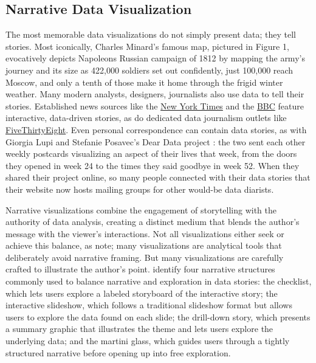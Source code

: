 \subsection{Narrative Data Visualization}\label{lit-review-narrative}
The most memorable data visualizations do not simply present data; they tell stories. Most iconically, Charles Minard's famous map, pictured in Figure 1, evocatively depicts Napoleons Russian campaign of 1812 by mapping the army's journey and its size as 422,000 soldiers set out confidently, just 100,000 reach Moscow, and only a tenth of those make it home through the frigid winter weather. Many modern analysts, designers, journalists also use data to tell their stories. Established news sources like the \href{http://www.nytimes.com/interactive/2015/us/year-in-interactive-storytelling.html}{New York Times} and the \href{http://www.bbc.com/news/11628973}{BBC} feature interactive, data-driven stories, as do dedicated data journalism outlets like \href{http://fivethirtyeight.com/}{FiveThirtyEight}. Even personal correspondence can contain data stories, as with Giorgia Lupi and Stefanie Posavec's Dear Data project \citep{DearData}: the two sent each other weekly postcards visualizing an aspect of their lives that week, from the doors they opened in week 24 to the times they said goodbye in week 52. When they shared their project online, so many people connected with their data stories that their website now hosts mailing groups for other would-be data diarists.

Narrative visualizations combine the engagement of storytelling with the authority of data analysis, creating a distinct medium that blends the author's message with the viewer's interactions. Not all visualizations either seek or achieve this balance, as \citet{LeeEtAl2015More} note; many visualizations are analytical tools that deliberately avoid narrative framing. But many visualizations are carefully crafted to illustrate the author's point. \citet{SegelHeer2010Narrative} identify four narrative structures commonly used to balance narrative and exploration in data stories: the checklist, which lets users explore a labeled storyboard of the interactive story; the interactive slideshow, which follows a traditional slideshow format but allows users to explore the data found on each slide; the drill-down story, which presents a summary graphic that illustrates the theme and lets users explore the underlying data; and the martini glass, which guides users through a tightly structured narrative before opening up into free exploration.

